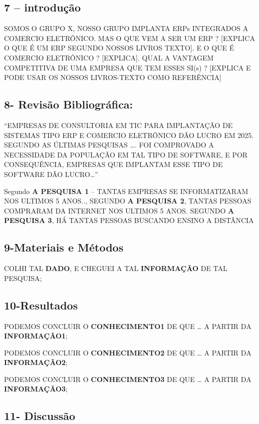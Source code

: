 \documentclass[
]{book}
\begin{document}
\subsection{7 -- introdução}\label{introduuxe7uxe3o}

SOMOS O GRUPO X, NOSSO GRUPO IMPLANTA ERPs INTEGRADOS A COMERCIO ELETRÔNICO. MAS O QUE VEM A SER UM ERP ? {[}EXPLICA O QUE É UM ERP SEGUNDO NOSSOS LIVROS TEXTO{]}. E O QUE É COMERCIO ELETRÔNICO ? {[}EXPLICA{]}. QUAL A VANTAGEM COMPETITIVA DE UMA EMPRESA QUE TEM ESSES SI(s) ? {[}EXPLICA E PODE USAR OS NOSSOS LIVROS-TEXTO COMO REFERÊNCIA{]}

\subsection{8- Revisão Bibliográfica:}\label{revisuxe3o-bibliogruxe1fica}

``EMPRESAS DE CONSULTORIA EM TIC PARA IMPLANTAÇÃO DE SISTEMAS TIPO ERP E COMERCIO ELETRÔNICO DÃO LUCRO EM 2025. SEGUNDO AS ÚLTIMAS PESQUISAS \ldots. FOI COMPROVADO A NECESSIDADE DA POPULAÇÃO EM TAL TIPO DE SOFTWARE, E POR CONSEQUÊNCIA, EMPRESAS QUE IMPLANTAM ESSE TIPO DE SOFTWARE DÃO LUCRO\ldots{}''

Segundo \textbf{A PESQUISA 1} -- TANTAS EMPRESAS SE INFORMATIZARAM NOS ULTIMOS 5 ANOS.., SEGUNDO \textbf{A PESQUISA 2}, TANTAS PESSOAS COMPRARAM DA INTERNET NOS ULTIMOS 5 ANOS. SEGUNDO \textbf{A PESQUISA 3}, HÁ TANTAS PESSOAS BUSCANDO ENSINO A DISTÂNCIA

\subsection{9-Materiais e Métodos}\label{materiais-e-muxe9todos}

COLHI TAL \textbf{DADO}, E CHEGUEI A TAL \textbf{INFORMAÇÃO} DE TAL PESQUISA;

\subsection{10-Resultados}\label{resultados}

PODEMOS CONCLUIR O \textbf{CONHECIMENTO1} DE QUE \ldots{} A PARTIR DA \textbf{INFORMAÇÃO1};

PODEMOS CONCLUIR O \textbf{CONHECIMENTO2} DE QUE \ldots{} A PARTIR DA \textbf{INFORMAÇÃO2};

PODEMOS CONCLUIR O \textbf{CONHECIMENTO3} DE QUE \ldots{} A PARTIR DA \textbf{INFORMAÇÃO3};

\subsection{11- Discussão}\label{discussuxe3o}
\end{document}
